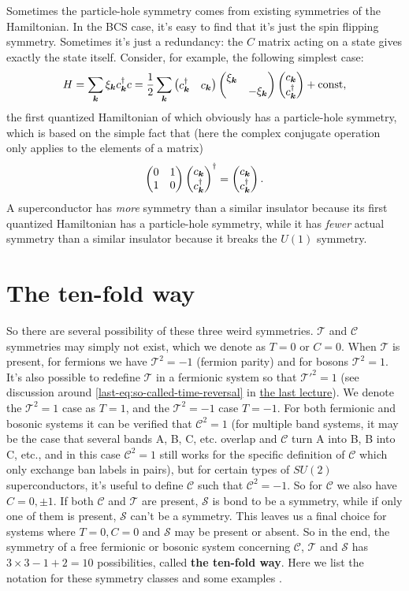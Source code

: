 \documentclass[hyperref, a4paper]{article}
\newcommand*{\concept}[1]{{\textbf{#1}}}
\newcommand{\lastlec}{\href{./2022-3-15.pdf}{the last lecture}}
\begin{document}
Sometimes the particle-hole symmetry comes from existing symmetries of the Hamiltonian. In the 
BCS case, it's easy to find that it's just the spin flipping symmetry.
Sometimes it's just a redundancy: the $C$ matrix acting on a state gives exactly the state itself.
Consider, for example, the following simplest case:
\begin{equation}
    H = \sum_{\vb*{k}} \xi_{\vb*{k}} c^\dagger_{\vb*{k}} c = \frac{1}{2} \sum_{\vb*{k}} \pmqty{c^\dagger_{\vb*{k}} & c_{\vb*{k}} } \pmqty{\dmat{\xi_{\vb*{k}}, - \xi_{\vb*{k}}}} \pmqty{c_{\vb*{k}} \\ c^\dagger_{\vb*{k}}} + \text{const},
\end{equation}
the first quantized Hamiltonian of which obviously has a particle-hole symmetry, which is based on the simple 
fact that (here the complex conjugate operation only applies to the elements of a matrix)
\[
    \pmqty{0 & 1 \\ 1 & 0} \pmqty{c_{\vb*{k}} \\ c^\dagger_{\vb*{k}}}^\dagger = \pmqty{c_{\vb*{k}} \\ c^\dagger_{\vb*{k}}}.
\]
A superconductor has \emph{more} symmetry than a similar insulator 
because its first quantized Hamiltonian has a particle-hole symmetry, while it has \emph{fewer} actual symmetry than a similar 
insulator because it breaks the $U(1)$ symmetry. 

\section{The ten-fold way}

So there are several possibility of these three weird symmetries. $\mathcal{T}$ and $\mathcal{C}$ symmetries 
may simply not exist, which we denote as ${T} = 0$ or ${C} = 0$. When $\mathcal{T}$ is present, for fermions 
we have $\mathcal{T}^2 = -1$ (fermion parity) and for bosons $\mathcal{T}^2 = 1$. It's also possible to 
redefine $\mathcal{T}$ in a fermionic system so that $\mathcal{T}'^2 = 1$ (see discussion around \eqref{last-eq:so-called-time-reversal} in \lastlec). We denote the $\mathcal{T}^2 = 1$ case as $T=1$, and the 
$\mathcal{T}^2 = -1$ case $T=-1$. For both fermionic and bosonic systems it can be verified that 
$\mathcal{C}^2 = 1$ (for multiple band systems, it may be the case that several bands A, B, C, etc. overlap
and $\mathcal{C}$ turn A into B, B into C, etc., and in this case $\mathcal{C}^2 = 1$ still works for the 
specific definition of $\mathcal{C}$ which only exchange ban labels in pairs), but for certain types of 
$SU(2)$ superconductors, it's useful to define $\mathcal{C}$ such that $\mathcal{C}^2 = -1$. 
So for $\mathcal{C}$ we also have $C = 0, \pm 1$. If both $\mathcal{C}$ and $\mathcal{T}$ are present, 
$\mathcal{S}$ is bond to be a symmetry, while if only one of them is present, $\mathcal{S}$ can't be 
a symmetry. This leaves us a final choice for systems where $T = 0, C = 0$ and $\mathcal{S}$ may be present 
or absent. So in the end, the symmetry of a free fermionic or bosonic system concerning $\mathcal{C}$, 
$\mathcal{T}$ and $\mathcal{S}$ has $3 \times 3 - 1 + 2 = 10$ possibilities, called \concept{the ten-fold way}. Here we list the notation for these symmetry classes and some examples \cite{Ryu_2010}.
\end{document}
